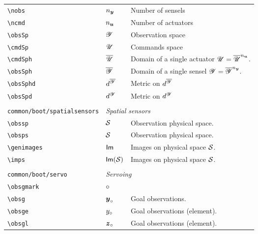 \begin{longtable}{lll}
 {\color[rgb]{0.5,0.5,0.5}\texttt{\textbackslash nobs}} & ${n_{\boldsymbol{y}}}$ &  Number of sensels\\ 
 {\color[rgb]{0.5,0.5,0.5}\texttt{\textbackslash ncmd}} & ${n_{\boldsymbol{u}}}$ &  Number of actuators\\ 
 {\color[rgb]{0.5,0.5,0.5}\texttt{\textbackslash obsSp}} & $\mathscr{Y}$ &  Observation space \\ 
 {\color[rgb]{0.5,0.5,0.5}\texttt{\textbackslash cmdSp}} & $\mathscr{U}$ &  Commands space\\ 
 {\color[rgb]{0.5,0.5,0.5}\texttt{\textbackslash cmdSph}} & $\overline{\mathscr{U}}$ &  Domain of a single actuator $\mathscr{U}=\overline{\mathscr{U}}^{n_{\boldsymbol{u}}}$.\\ 
 {\color[rgb]{0.5,0.5,0.5}\texttt{\textbackslash obsSph}} & $\overline{\mathscr{Y}}$ &  Domain of a single sensel $\mathscr{Y}=\overline{\mathscr{Y}}^{n_{\boldsymbol{y}}}$.\\ 
 {\color[rgb]{0.5,0.5,0.5}\texttt{\textbackslash obsSphd}} & $d^{\overline{\mathscr{Y}}}$ &  Metric on $d^{\overline{\mathscr{Y}}}$\\ 
 {\color[rgb]{0.5,0.5,0.5}\texttt{\textbackslash obsSpd}} & $d^{\mathscr{Y}}$ &  Metric on $d^{\mathscr{Y}}$\\ 
  &  & \\ 
 {\color[rgb]{0.5,0.5,0.5}\texttt{common/boot/spatialsensors}} & \multicolumn{2}{l}{\emph{Spatial sensors}}\\ 
 \hline
{\color[rgb]{0.5,0.5,0.5}\texttt{\textbackslash obssp}} & $\obssp$ &  Observation physical space.\\ 
 {\color[rgb]{0.5,0.5,0.5}\texttt{\textbackslash obsps}} & $\obsps$ &  Observation physical space.\\ 
 {\color[rgb]{0.5,0.5,0.5}\texttt{\textbackslash genimages}} & $\mathsf{Im}$ &  Images on physical space $\obsps$.\\ 
 {\color[rgb]{0.5,0.5,0.5}\texttt{\textbackslash imps}} & $\imps$ &  Images on physical space $\obsps$.\\ 
  &  & \\ 
 {\color[rgb]{0.5,0.5,0.5}\texttt{common/boot/servo}} & \multicolumn{2}{l}{\emph{Servoing}}\\ 
 \hline
{\color[rgb]{0.5,0.5,0.5}\texttt{\textbackslash obsgmark}} & $\circ$ & \\ 
 {\color[rgb]{0.5,0.5,0.5}\texttt{\textbackslash obsg}} & $\boldsymbol{y}_{\circ}$ &  Goal observations.\\ 
 {\color[rgb]{0.5,0.5,0.5}\texttt{\textbackslash obsge}} & $y_{\circ}$ &  Goal observations (element).\\ 
 {\color[rgb]{0.5,0.5,0.5}\texttt{\textbackslash obsgl}} & $\boldsymbol{z}_{\circ}$ &  Goal observations (element).\\ 

\end{longtable}
